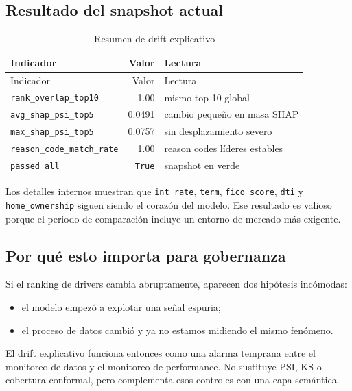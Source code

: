\documentclass[
  spanish,
  11pt,
  letterpaper,
]{scrbook}
\providecommand{\tightlist}{%
  \setlength{\itemsep}{0pt}\setlength{\parskip}{0pt}}
\theoremstyle{plain}
\theoremstyle{remark}
\begin{document}
\subsection{Resultado del snapshot
actual}\label{resultado-del-snapshot-actual}

\begin{longtable}[]{@{}lrl@{}}
\caption{Resumen de drift
explicativo}\label{tbl-explanation-drift}\tabularnewline
\toprule\noalign{}
Indicador & Valor & Lectura \\
\midrule\noalign{}
\endfirsthead
\toprule\noalign{}
Indicador & Valor & Lectura \\
\midrule\noalign{}
\endhead
\bottomrule\noalign{}
\endlastfoot
\texttt{rank\_overlap\_top10} & 1.00 & mismo top 10 global \\
\texttt{avg\_shap\_psi\_top5} & 0.0491 & cambio pequeño en masa SHAP \\
\texttt{max\_shap\_psi\_top5} & 0.0757 & sin desplazamiento severo \\
\texttt{reason\_code\_match\_rate} & 1.00 & reason codes líderes
estables \\
\texttt{passed\_all} & \texttt{True} & snapshot en verde \\
\end{longtable}

Los detalles internos muestran que \texttt{int\_rate}, \texttt{term},
\texttt{fico\_score}, \texttt{dti} y \texttt{home\_ownership} siguen
siendo el corazón del modelo. Ese resultado es valioso porque el periodo
de comparación incluye un entorno de mercado más exigente.

\subsection{Por qué esto importa para
gobernanza}\label{por-quuxe9-esto-importa-para-gobernanza}

Si el ranking de drivers cambia abruptamente, aparecen dos hipótesis
incómodas:

\begin{itemize}
\tightlist
\item
  el modelo empezó a explotar una señal espuria;
\item
  el proceso de datos cambió y ya no estamos midiendo el mismo fenómeno.
\end{itemize}

El drift explicativo funciona entonces como una alarma temprana entre el
monitoreo de datos y el monitoreo de performance. No sustituye PSI, KS o
cobertura conformal, pero complementa esos controles con una capa
semántica.
\end{document}
